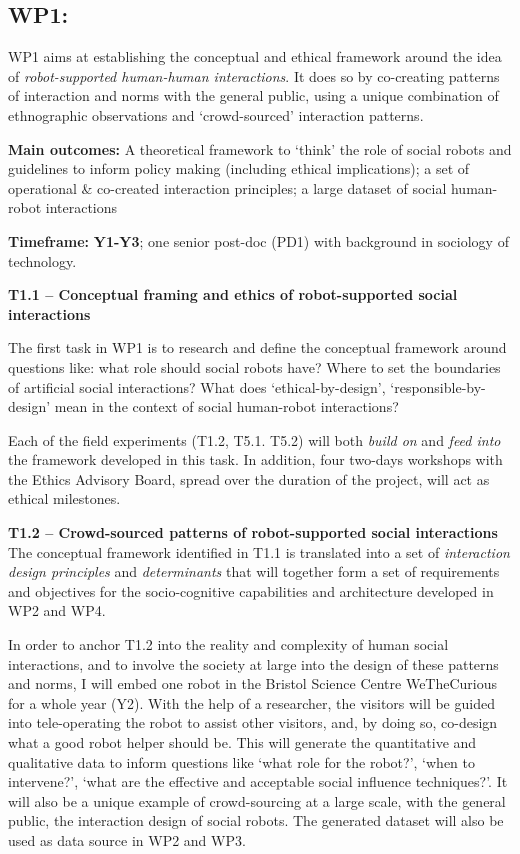 \subsection{WP1: \textbf{\wpOne}}

WP1 aims at establishing the conceptual and ethical framework around the idea of
\emph{robot-supported human-human interactions}. It does so by co-creating
patterns of interaction and norms with the general public, using a unique
combination of ethnographic observations and `crowd-sourced' interaction
patterns.

\begin{framed}
    \textbf{Main outcomes:} A theoretical framework to `think' the role of
    social robots and guidelines to inform policy making (including ethical
    implications); a set of operational \& co-created interaction principles; a
    large dataset of social human-robot interactions

    \textbf{Timeframe:} \textbf{Y1-Y3}; one senior post-doc (PD1)
with background in sociology of technology.
\end{framed}


\textbf{T1.1 -- Conceptual framing and ethics of robot-supported social
interactions}


The first task in WP1 is to research and define the conceptual framework around
questions like: what role should social robots have? Where
to set the boundaries of artificial social interactions? What does
`ethical-by-design', `responsible-by-design' mean in the context of social
human-robot interactions? 

Each of the field experiments (T1.2, T5.1. T5.2) will both \emph{build on} and
\emph{feed into} the framework developed in this task. In addition, four
two-days workshops with the \project Ethics Advisory Board, spread over the
duration of the project, will act as ethical milestones.

\textbf{T1.2 -- Crowd-sourced patterns of robot-supported social
interactions} The conceptual framework identified in T1.1 is translated
into a set of \emph{interaction design principles} and \emph{determinants} that
will together form a set of requirements and objectives for the socio-cognitive
capabilities and architecture developed in WP2 and WP4.

In order to anchor T1.2 into the reality and complexity of human social
interactions, and to involve the society at large into the design of these
patterns and norms, I will embed one \project robot in the Bristol Science
Centre WeTheCurious for a whole year (Y2). With the help of a researcher, the
visitors will be guided into tele-operating the robot to assist other visitors,
and, by doing so, co-design what a good robot helper should be. This will
generate the quantitative and qualitative data to inform questions like `what
role for the robot?', `when to intervene?', `what are the effective and
acceptable social influence techniques?'. It will also be a unique example of
crowd-sourcing at a large scale, with the general public, the interaction design
of social robots.  The generated dataset will also be used as data source in WP2
and WP3.

